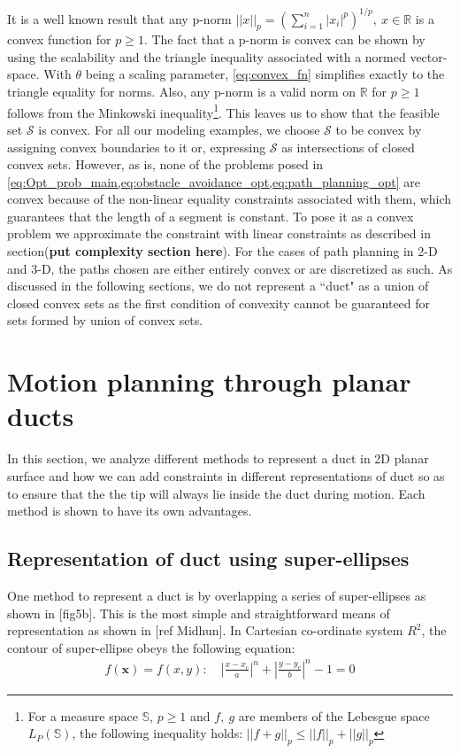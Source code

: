 \documentclass[12pt,a4]{article}
\begin{document}
It is a well known result that any p-norm $||x||_p=(\sum\limits_{i=1}^{n}|x_i|^p)^{1/p},~ x\in \mathbb{R}$ is a convex function for $p\geq 1$. The fact that a p-norm is convex can be shown by using the scalability and the triangle inequality associated with a normed vector-space. With $\theta$  being a scaling parameter, \cref{eq:convex_fn} simplifies exactly to the triangle equality for norms. Also, any p-norm is a valid norm on $\mathbb{R}$ for $p\geq1$ follows from the Minkowski inequality\footnote{For a measure space $\mathbb{S}$, $p\geq 1$ and $f,~g$ are members of the Lebesgue space $L_P(\mathbb{S})$, the following inequality holds: $||f+g||_p\leq ||f||_p+||g||_p$ }. This leaves us to show that the feasible set $\mathcal{S}$ is convex. For all our modeling examples, we choose $\mathcal{S}$ to be convex by assigning convex boundaries to it or, expressing $\mathcal{S}$ as intersections of closed convex sets.  However, as is, none of the problems posed in \cref{eq:Opt_prob_main,eq:obstacle_avoidance_opt,eq:path_planning_opt} are convex because of the non-linear equality constraints associated with them, which guarantees that the length of a segment is constant. To pose it as a convex problem we approximate the constraint with linear constraints as described in section(\textbf{put complexity section here}). For the cases of path planning in 2-D and 3-D, the paths chosen are either entirely convex or are discretized as such. As discussed in the following sections, we do not represent a ``duct" as a union of closed convex sets as the first condition of convexity cannot be guaranteed for sets formed by union of convex sets. 

\section{Motion planning through planar ducts}
%
In this section, we analyze different methods to represent a duct in 2D planar surface and how we can add constraints in different representations of duct so as to ensure that the the tip will always lie inside the duct during motion. Each method is shown to have its own advantages.
\subsection{Representation of duct using super-ellipses}
%
One method to represent a duct is by overlapping a series of super-ellipses as shown in [fig5b]. This is the most simple and straightforward means of representation as shown in [ref Midhun]. In Cartesian co-ordinate system $R^2$, the contour of super-ellipse obeys the following equation:
\begin{align}
f(\textbf{x})= f(x,y):\quad \left \vert \frac{x-x_c}{a} \right\vert^n+\left\vert \frac{y-y_c}{b} \right\vert^n-1=0
\end{align}
\end{document}
